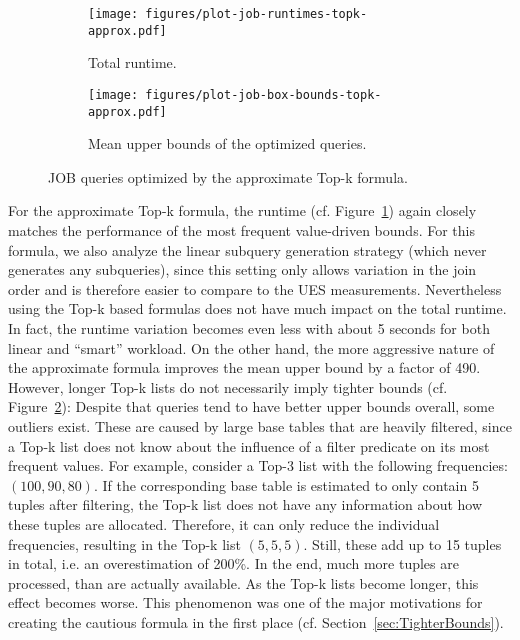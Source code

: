\begin{figure}[tb]
	\centering
	\begin{subfigure}[b]{0.47\textwidth}
	    \centering
	    \texttt{[image: figures/plot-job-runtimes-topk-approx.pdf]}
	    \caption{Total runtime.}
	    \label{fig:results-job-runtimes-approx}
	\end{subfigure}
	\begin{subfigure}[b]{0.47\textwidth}
	    \centering
	    \texttt{[image: figures/plot-job-box-bounds-topk-approx.pdf]}
	    \caption{Mean upper bounds of the optimized queries.}
	    \label{fig:results-job-bounds-approx}
	\end{subfigure}
	\caption{JOB queries optimized by the approximate Top-k formula.}
	\label{fig:results-job-approx}
\end{figure}

For the approximate Top-k formula, the runtime (cf. Figure~\ref{fig:results-job-runtimes-approx}) again closely matches the performance of  the most frequent value-driven bounds. For this formula, we also analyze the linear subquery generation strategy (which never generates any subqueries), since this setting only allows variation in the join order and is therefore easier to compare to the UES measurements. Nevertheless using the Top-k based formulas does not have much impact on the total runtime. In fact, the runtime variation becomes even less with about 5 seconds for both linear and ``smart'' workload. On the other hand, the more aggressive nature of the approximate formula improves the mean upper bound by a factor of 490. However, longer Top-k lists do not necessarily imply tighter bounds (cf. Figure~\ref{fig:results-job-bounds-approx}): Despite that queries tend to have better upper bounds overall, some outliers exist. These are caused by large base tables that are heavily filtered, since a Top-k list does not know about the influence of a filter predicate on its most frequent values. For example, consider a Top-3 list with the following frequencies: $(100, 90, 80)$. If the corresponding base table is estimated to only contain 5 tuples after filtering, the Top-k list does not have any information about how these tuples are allocated. Therefore, it can only reduce the individual frequencies, resulting in the Top-k list $(5, 5, 5)$. Still, these add up to 15 tuples in total, i.e. an overestimation of 200\%. In the end, much more tuples are processed, than are actually available. As the Top-k lists become longer, this effect becomes worse. This phenomenon was one of the major motivations for creating the cautious formula in the first place (cf. Section~\ref{sec:TighterBounds}).

